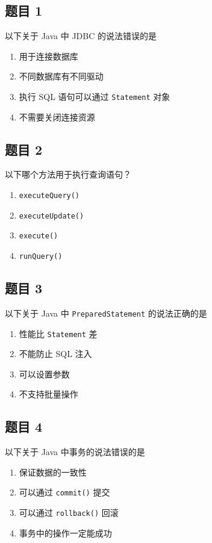 \documentclass[12pt,a4paper]{ctexart}
\begin{document}
\subsection*{题目 1}
以下关于 Java 中 JDBC 的说法错误的是
\begin{enumerate}[label=\Alph*.]
    \item 用于连接数据库
    \item 不同数据库有不同驱动
    \item 执行 SQL 语句可以通过 \texttt{Statement} 对象
    \item 不需要关闭连接资源
\end{enumerate}

\subsection*{题目 2}
以下哪个方法用于执行查询语句？
\begin{enumerate}[label=\Alph*.]
    \item \texttt{executeQuery()}
    \item \texttt{executeUpdate()}
    \item \texttt{execute()}
    \item \texttt{runQuery()}
\end{enumerate}

\subsection*{题目 3}
以下关于 Java 中 \texttt{PreparedStatement} 的说法正确的是
\begin{enumerate}[label=\Alph*.]
    \item 性能比 \texttt{Statement} 差
    \item 不能防止 SQL 注入
    \item 可以设置参数
    \item 不支持批量操作
\end{enumerate}

\subsection*{题目 4}
以下关于 Java 中事务的说法错误的是
\begin{enumerate}[label=\Alph*.]
    \item 保证数据的一致性
    \item 可以通过 \texttt{commit()} 提交
    \item 可以通过 \texttt{rollback()} 回滚
    \item 事务中的操作一定能成功
\end{enumerate}
\end{document}
